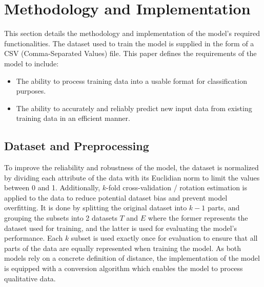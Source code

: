 \documentclass[twocolumn, a4paper, 8pt]{article}
\newcommand{\sups}[1]{\textsuperscript{#1}}
\begin{document}
	\section{Methodology and Implementation}
	This section details the methodology and implementation of the model's required functionalities. The dataset used to train the model is supplied in the form of a CSV (Comma-Separated Values) file. This paper defines the requirements of the model to include:
	\begin{itemize}
		\item The ability to process training data into a usable format for classification purposes.
		\item The ability to accurately and reliably predict new input data from existing training data in an efficient manner.
	\end{itemize}
	
	\subsection{Dataset and Preprocessing}
	To improve the reliability and robustness of the model, the dataset is normalized by dividing each attribute of the data with its Euclidian norm to limit the values between 0 and 1. Additionally, $k$-fold cross-validation / rotation estimation is applied to the data to reduce potential dataset bias and prevent model overfitting\sups{\cite{brownlee_2023, arya_2022_why}}. It is done by splitting the original dataset into $k-1$ parts, and grouping the subsets into 2 datasets $T$ and $E$ where the former represents the dataset used for training, and the latter is used for evaluating the model's performance\sups{\cite{berrar_2019_crossvalidation}}. Each $k$ subset is used exactly once for evaluation to ensure that all parts of the data are equally represented when training the model. As both models rely on a concrete definition of distance, the implementation of the model is equipped with a conversion algorithm which enables the model to process qualitative data.
	
\end{document}
